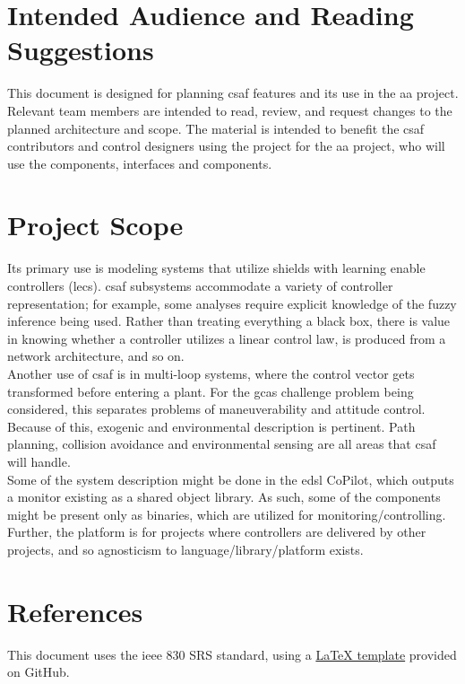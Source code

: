 \section{Intended Audience and Reading Suggestions}

This document is designed for planning \acrshort{csaf} features and its use in the \acrlong{aa} project. 
Relevant team members are intended to read, review, and request changes to the planned architecture and 
scope. The material is intended to benefit the \acrshort{csaf} contributors and control designers using the 
project for the \acrlong{aa} project, who will use the components, interfaces and components.\\

\section{Project Scope}
Its primary use is modeling systems that utilize shields with learning enable controllers (\acrshort{lec}s). 
\acrshort{csaf} subsystems accommodate a variety of controller representation; for example, some analyses 
require explicit knowledge of the fuzzy inference being used. Rather than treating everything a black box, 
there is value in knowing whether a controller utilizes a linear control law, is produced from a network 
architecture, and so on.\\

Another use of \acrshort{csaf} is in multi-loop systems, where the control vector gets transformed before 
entering a plant. For the \acrlong{gcas} challenge problem being considered, this separates problems of 
maneuverability and attitude control. Because of this, exogenic and environmental description is pertinent. 
Path planning, collision avoidance and environmental sensing are all areas that \acrshort{csaf} will handle.\\

Some of the system description might be done in the \acrshort{edsl} CoPilot, which outputs a monitor 
existing as a shared object library. As such, some of the components might be present only as binaries, which 
are utilized for monitoring/controlling. Further, the platform is for projects where controllers are 
delivered by other projects, and so agnosticism to language/library/platform exists. 

\section{References}

This document uses the \acrshort{ieee} 830 SRS standard, using a \href{https://github.com/jpeisenbarth/SRS-Tex}{\LaTeX{} template} provided on GitHub.  \\
